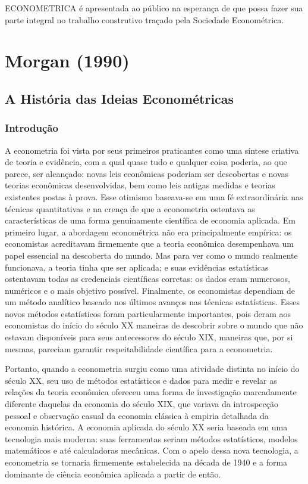 \documentclass[12pt]{article}
\begin{document}
ECONOMETRICA é apresentada ao público na esperança de que possa fazer sua parte integral no trabalho construtivo traçado pela Sociedade Econométrica.

\section{\textbf{Morgan (1990)}}
\subsection{\textbf{A História das Ideias Econométricas}}
\subsubsection{\textbf{Introdução}}
A econometria foi vista por seus primeiros praticantes como uma síntese criativa de teoria e evidência, com a qual quase tudo e qualquer coisa poderia, ao que parece, ser alcançado: novas leis econômicas poderiam ser descobertas e novas teorias econômicas desenvolvidas, bem como leis antigas medidas e teorias existentes postas à prova. Esse otimismo baseava-se em uma fé extraordinária nas técnicas quantitativas e na crença de que a econometria ostentava as características de uma forma genuinamente científica de economia aplicada. Em primeiro lugar, a abordagem econométrica não era principalmente empírica: os economistas acreditavam firmemente que a teoria econômica desempenhava um papel essencial na descoberta do mundo. Mas para ver como o mundo realmente funcionava, a teoria tinha que ser aplicada; e suas evidências estatísticas ostentavam todas as credenciais científicas corretas: os dados eram numerosos, numéricos e o mais objetivo possível. Finalmente, os economistas dependiam de um método analítico baseado nos últimos avanços nas técnicas estatísticas. Esses novos métodos estatísticos foram particularmente importantes, pois deram aos economistas do início do século XX maneiras de descobrir sobre o mundo que não estavam disponíveis para seus antecessores do século XIX, maneiras que, por si mesmas, pareciam garantir respeitabilidade científica para a econometria.

Portanto, quando a econometria surgiu como uma atividade distinta no início do século XX, seu uso de métodos estatísticos e dados para medir e revelar as relações da teoria econômica ofereceu uma forma de investigação marcadamente diferente daquelas da economia do século XIX, que variava da introspecção pessoal e observação casual da economia clássica à empiria detalhada da economia histórica. A economia aplicada do século XX seria baseada em uma tecnologia mais moderna: suas ferramentas seriam métodos estatísticos, modelos matemáticos e até calculadoras mecânicas. Com o apelo dessa nova tecnologia, a econometria se tornaria firmemente estabelecida na década de 1940 e a forma dominante de ciência econômica aplicada a partir de então.
\end{document}
